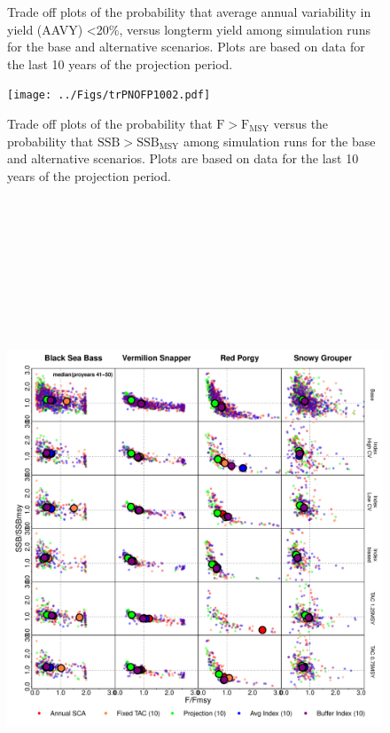 \documentclass[12pt,english]{article}
\begin{document}
\begin{appendix}
\begin{figure}[!ht]
\begin{flushleft}
\caption{Trade off plots of the probability that average annual variability in yield (AAVY) <20\%, versus  longterm yield among simulation runs for the base and alternative scenarios. Plots are based on data for the last 10 years of the projection period.}
\label{fig:trAAVYYldLT2}
\end{flushleft}
\end{figure}
\clearpage\begin{figure}[!ht]
\begin{center}
\texttt{[image: ../Figs/trPNOFP1002.pdf]}
\end{center}
\begin{flushleft}
\caption{Trade off plots of the probability that $\mathrm{F > F_{MSY}}$  versus  the probability that $\mathrm{SSB > SSB_{MSY}}$ among simulation runs for the base and alternative scenarios. Plots are based on data for the last 10 years of the projection period.}
\label{fig:trPNOFP1002}
\end{flushleft}
\end{figure}
\clearpage
\begin{figure}[!ht]
\begin{center}
\includegraphics[width=7in, height=8in]{../Figs/phasePlot2.pdf}

\end{center}
\end{figure}
\end{appendix}
\end{document}
